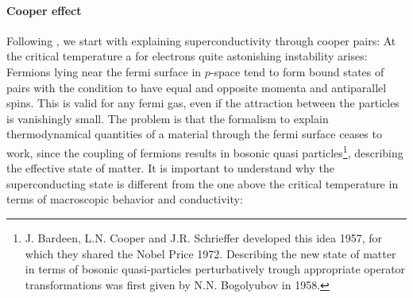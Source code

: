 \paragraph{Cooper effect} Following \cite{Landau}, we start with explaining superconductivity through
cooper pairs: At the critical temperature a for electrons quite astonishing instability arises: Fermions lying 
near the fermi surface in $p$-space tend to form bound states of pairs with the condition to have equal and
opposite momenta and antiparallel spins. This is valid for any fermi gas, even if the attraction between the
particles is vanishingly small. The problem is that the formalism to explain thermodynamical quantities 
of a material through the fermi surface ceases to work, since the coupling of fermions results in bosonic quasi
particles\footnote{J. Bardeen, L.N. Cooper and J.R. Schrieffer developed this idea 1957, for which
they shared the Nobel Price 1972. Describing the new state of matter in terms of bosonic quasi-particles perturbatively 
trough appropriate operator transformations was first given by N.N. Bogolyubov in 1958.}, 
describing the effective state of matter. It is important to understand why the superconducting state 
is different from the one above the critical temperature in terms of macroscopic behavior and conductivity:
